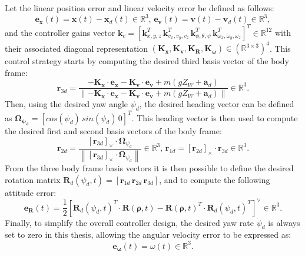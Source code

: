 Let the linear position error and linear velocity error be defined as follows:
\begin{equation}\label{eq:pos_error}
  \boldsymbol{e_x}(t) = \boldsymbol{x}(t) - \boldsymbol{x}_d(t) \in \mathbb{R}^3, \,
  \boldsymbol{e_v}(t) = \boldsymbol{v}(t) - \boldsymbol{v}_d(t) \in \mathbb{R}^3,
\end{equation}
and the controller gains vector \(\boldsymbol{k}_c = [\boldsymbol{k}_{x,y,z}^T \, \boldsymbol{k}_{v_x,v_y,v_z}^T \, \boldsymbol{k}_{\phi,\theta,\psi}^T \, \boldsymbol{k}_{\omega_x,\omega_y,\omega_z}^T]^T \in \mathbb{R}^{12}\) with their associated diagonal representation $(\boldsymbol{K_x}, \boldsymbol{K_v}, \boldsymbol{K_R}, \boldsymbol{K_\omega}) \in (\mathbb{R}^{3\times3})^4$.
This control strategy starts by computing the desired third basis vector of the body frame:
\begin{equation}
  \boldsymbol{r}_{3d} = \frac{-\boldsymbol{K_x} \cdot \boldsymbol{e_x} - \boldsymbol{K_v} \cdot \boldsymbol{e_v} + m(g Z_W + \boldsymbol{a}_d) }{\left\| -\boldsymbol{K_x} \cdot \boldsymbol{e_x} - \boldsymbol{K_v} \cdot \boldsymbol{e_v} + m(g Z_W + \boldsymbol{a}_d) \right\|} \in \mathbb{R}^3.
\end{equation}
Then, using the desired yaw angle $\psi_d$, the desired heading vector can be defined as $\boldsymbol{\Omega_{\psi_d}} = [cos(\psi_d) \, sin(\psi_d) \, 0]^T$.
This heading vector is then used to compute the desired first and second basis vectors of the body frame:
\begin{equation}
  \boldsymbol{r}_{2d} = \frac{\left[\boldsymbol{r}_{3d}\right]_{\times} \cdot \boldsymbol{\Omega}_{\psi_d}}{\left\|\left[\boldsymbol{r}_{3d}\right]_{\times} \cdot \boldsymbol{\Omega}_{\psi_d}\right\|} \in \mathbb{R}^3, \, \boldsymbol{r}_{1d} = \left[\boldsymbol{r}_{2d}\right]_{\times} \cdot \boldsymbol{r}_{3d} \in \mathbb{R}^3.
\end{equation}
From the three body frame basis vectors it is then possible to define the desired rotation matrix $\boldsymbol{R}_d(\psi_d, t) = [\boldsymbol{r}_{1d} \, \boldsymbol{r}_{2d} \, \boldsymbol{r}_{3d}]$, and to compute the following attitude error:
\begin{equation}\label{eq:att_error}
  \boldsymbol{e_R}(t) = \frac{1}{2}[\boldsymbol{R}_d(\psi_d, t)^T \cdot \boldsymbol{R}(\boldsymbol{\rho}, t) - \boldsymbol{R}(\boldsymbol{\rho}, t)^T \cdot \boldsymbol{R}_d(\psi_d, t)^T]^\vee \in \mathbb{R}^3.
\end{equation}
Finally, to simplify the overall controller design, the desired yaw rate $\Dot{\psi}_d$ is always set to zero in this thesis, allowing the angular velocity error to be expressed as:
\begin{equation}\label{eq:rate_error}
  \boldsymbol{e_\omega}(t) = \omega(t) \in \mathbb{R}^3.
\end{equation}

